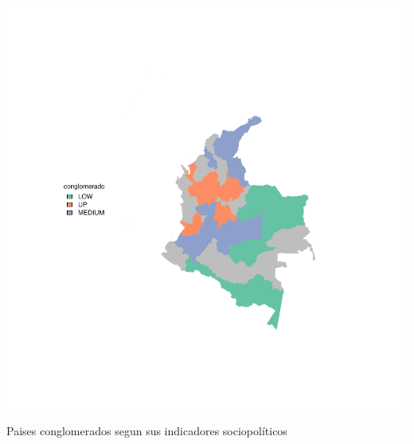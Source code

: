 \documentclass{article}
\begin{document}
\centering

\includegraphics{ProyectoFINAL-getMapconglomerado}

\caption{Paises conglomerados segun sus indicadores sociopolíticos}\label{clustmap}



\renewcommand{\refname}{Bibliografia}

\end{document}
